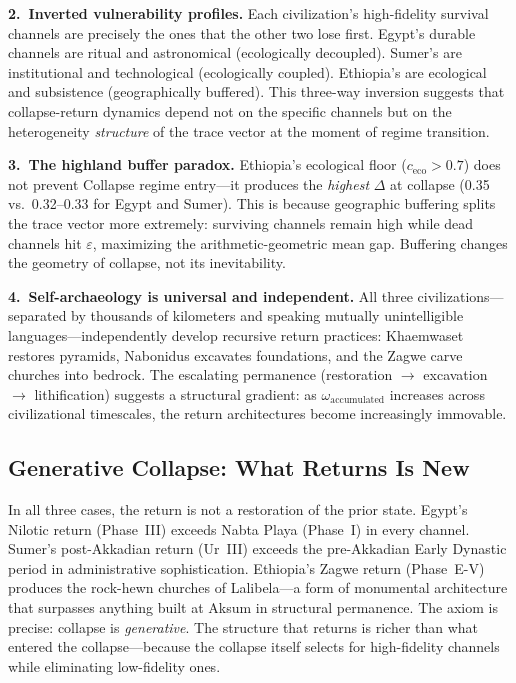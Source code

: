 \documentclass[
  aps,
  prd,
  twocolumn,
  superscriptaddress,
  nofootinbib,
  floatfix
]{revtex4-2}
\newcommand{\eps}{\varepsilon}
\begin{document}
\textbf{2.~Inverted vulnerability profiles.}  Each
civilization's high-fidelity survival channels are
precisely the ones that the other two lose first.
Egypt's durable channels are ritual and astronomical
(ecologically decoupled).  Sumer's are institutional
and technological (ecologically coupled).  Ethiopia's
are ecological and subsistence (geographically
buffered).  This three-way inversion suggests that
collapse-return dynamics depend not on the specific
channels but on the heterogeneity \emph{structure} of
the trace vector at the moment of regime transition.

\textbf{3.~The highland buffer paradox.}
Ethiopia's ecological floor ($c_{\mathrm{eco}} > 0.7$)
does not prevent Collapse regime entry---it produces
the \emph{highest} $\Delta$ at collapse (0.35 vs.\
0.32--0.33 for Egypt and Sumer).  This is because
geographic buffering splits the trace vector more
extremely: surviving channels remain high while dead
channels hit $\eps$, maximizing the arithmetic-geometric
mean gap.  Buffering changes the geometry of collapse,
not its inevitability.

\textbf{4.~Self-archaeology is universal and
independent.}  All three civilizations---separated by
thousands of kilometers and speaking mutually
unintelligible languages---independently develop
recursive return practices: Khaemwaset restores
pyramids, Nabonidus excavates foundations, and the
Zagwe carve churches into bedrock.  The escalating
permanence (restoration $\to$ excavation $\to$
lithification) suggests a structural gradient: as
$\omega_{\mathrm{accumulated}}$ increases across
civilizational timescales, the return architectures
become increasingly immovable.

\subsection{Generative Collapse: What Returns Is
New}

In all three cases, the return is not a restoration
of the prior state.  Egypt's Nilotic return
(Phase~III) exceeds Nabta Playa (Phase~I) in every
channel.  Sumer's post-Akkadian return (Ur~III)
exceeds the pre-Akkadian Early Dynastic period in
administrative sophistication.  Ethiopia's Zagwe
return (Phase~E-V) produces the rock-hewn churches of
Lalibela---a form of monumental architecture that
surpasses anything built at Aksum in structural
permanence.  The axiom is precise: collapse is
\emph{generative}.  The structure that returns is
richer than what entered the collapse---because the
collapse itself selects for high-fidelity channels
while eliminating low-fidelity ones.
\end{document}

